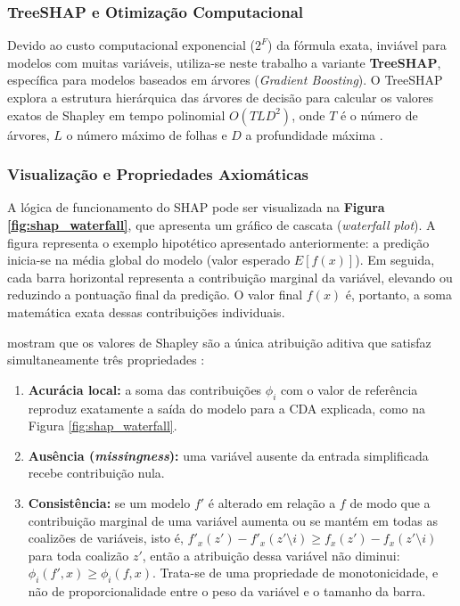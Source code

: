 \subsubsection{TreeSHAP e Otimização Computacional}

Devido ao custo computacional exponencial ($2^F$) da fórmula exata, inviável para modelos com muitas variáveis, utiliza-se neste trabalho a variante \textbf{TreeSHAP}, específica para modelos baseados em árvores (\textit{Gradient Boosting}). O TreeSHAP explora a estrutura hierárquica das árvores de decisão para calcular os valores exatos de Shapley em tempo polinomial $O(TLD^2)$, onde $T$ é o número de árvores, $L$ o número máximo de folhas e $D$ a profundidade máxima \cite{lundbergUnifiedApproachInterpreting2017}. 

\subsubsection{Visualização e Propriedades Axiomáticas}

A lógica de funcionamento do SHAP pode ser visualizada na \textbf{Figura \ref{fig:shap_waterfall}}, que apresenta um gráfico de cascata (\textit{waterfall plot}). A figura representa o exemplo hipotético apresentado anteriormente: a predição inicia-se na média global do modelo (valor esperado $E[f(x)]$). Em seguida, cada barra horizontal representa a contribuição marginal da variável, elevando ou reduzindo a pontuação final da predição. O valor final $f(x)$ é, portanto, a soma matemática exata dessas contribuições individuais.



 mostram que os valores de Shapley são a única atribuição aditiva que satisfaz simultaneamente três propriedades \cite{shreyaExplainableArtificialIntelligence2025}:
\begin{enumerate}
    \item \textbf{Acurácia local:} a soma das contribuições $\phi_i$ com o valor de referência reproduz exatamente a saída do modelo para a CDA explicada, como na Figura \ref{fig:shap_waterfall}.
    \item \textbf{Ausência (\textit{missingness}):} uma variável ausente da entrada simplificada recebe contribuição nula.
    \item \textbf{Consistência:} se um modelo $f'$ é alterado em relação a $f$ de modo que a contribuição marginal de uma variável aumenta ou se mantém em todas as coalizões de variáveis, isto é, $f'_x(z') - f'_x(z' \setminus i) \geq f_x(z') - f_x(z' \setminus i)$ para toda coalizão $z'$, então a atribuição dessa variável não diminui: $\phi_i(f', x) \geq \phi_i(f, x)$. Trata-se de uma propriedade de monotonicidade, e não de proporcionalidade entre o peso da variável e o tamanho da barra.
\end{enumerate}

